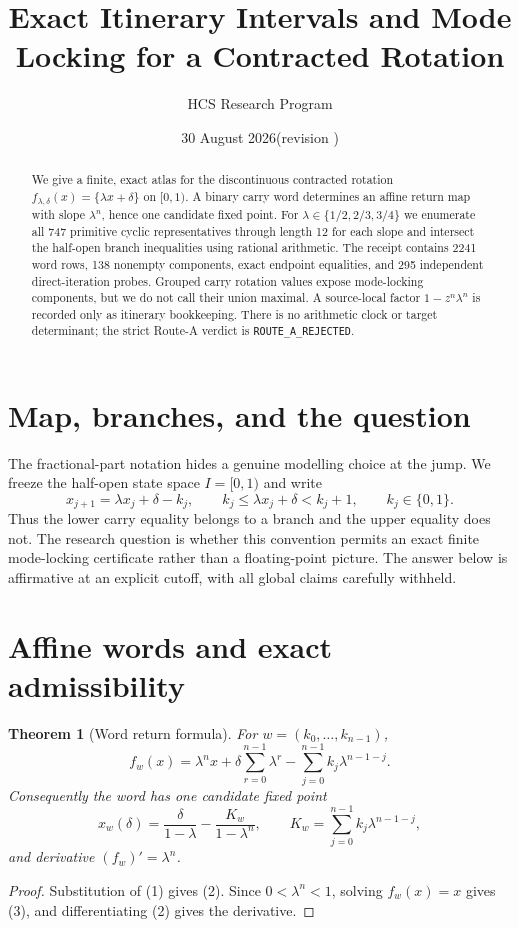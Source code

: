 \documentclass[10pt]{article}
\title{Exact Itinerary Intervals and Mode Locking for a Contracted Rotation}
\author{HCS Research Program}
\date{30 August 2026\quad (revision \CRevisionRound)}
\newtheorem{theorem}{Theorem}
\begin{document}
\maketitle
\begin{abstract}
We give a finite, exact atlas for the discontinuous contracted rotation
\(f_{\lambda,\delta}(x)=\{\lambda x+\delta\}\) on \([0,1)\).  A binary carry
word determines an affine return map with slope \(\lambda^n\), hence one
candidate fixed point.  For \(\lambda\in\{1/2,2/3,3/4\}\) we enumerate all
747 primitive cyclic representatives through length 12 for each slope and
intersect the half-open branch inequalities using rational arithmetic.  The
receipt contains 2241 word rows, 138 nonempty components, exact endpoint
equalities, and 295 independent direct-iteration probes.  Grouped carry
rotation values expose mode-locking components, but we do not call their union
maximal.  A source-local factor \(1-z^n\lambda^n\) is recorded only as
itinerary bookkeeping.  There is no arithmetic clock or target determinant;
the strict Route-A verdict is \texttt{ROUTE\_A\_REJECTED}.
\end{abstract}

\section{Map, branches, and the question}
The fractional-part notation hides a genuine modelling choice at the jump.
We freeze the half-open state space \(I=[0,1)\) and write
\begin{equation}
 x_{j+1}=\lambda x_j+\delta-k_j,\qquad
 k_j\leq\lambda x_j+\delta<k_j+1,\qquad k_j\in\{0,1\}. \tag{1}
\end{equation}
Thus the lower carry equality belongs to a branch and the upper equality does
not.  The research question is whether this convention permits an exact
finite mode-locking certificate rather than a floating-point picture.  The
answer below is affirmative at an explicit cutoff, with all global claims
carefully withheld.

\section{Affine words and exact admissibility}
\begin{theorem}[Word return formula]
For \(w=(k_0,\ldots,k_{n-1})\),
\begin{equation}
 f_w(x)=\lambda^n x+\delta\sum_{r=0}^{n-1}\lambda^r
 -\sum_{j=0}^{n-1}k_j\lambda^{n-1-j}. \tag{2}
\end{equation}
Consequently the word has one candidate fixed point
\begin{equation}
 x_w(\delta)=\frac{\delta}{1-\lambda}
 -\frac{K_w}{1-\lambda^n},\qquad
 K_w=\sum_{j=0}^{n-1}k_j\lambda^{n-1-j}, \tag{3}
\end{equation}
and derivative \((f_w)'=\lambda^n\).
\end{theorem}
\begin{proof}
Substitution of (1) gives (2).  Since \(0<\lambda^n<1\), solving
\(f_w(x)=x\) gives (3), and differentiating (2) gives the derivative.
\end{proof}
\end{document}
